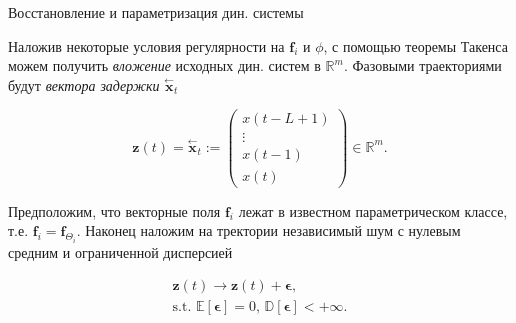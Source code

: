 \documentclass[10pt]{beamer}
\newcommand{\delayV}[1]{\overset{\leftarrow}{\textbf{x}}_{#1}}
\theoremstyle{definition}
\begin{document}
	\begin{frame}{Восстановление и параметризация дин. системы}
		
		Наложив некоторые условия регулярности на $\textbf{f}_i$ и $\phi$, с помощью теоремы Такенса можем получить \emph{вложение} исходных дин. систем в $\mathbb{R}^m$. Фазовыми траекториями будут \emph{вектора задержки} $\delayV{t}$
		
		\begin{equation*}
			\textbf{z}(t) = \delayV{t} := \begin{pmatrix}
				x(t - L + 1) \\
				\vdots \\
				x(t - 1) \\
				x(t)
			\end{pmatrix} \in \mathbb{R}^m.
		\end{equation*}
		
		Предположим, что векторные поля $\textbf{f}_i$ лежат в известном параметрическом классе, т.е. $\textbf{f}_i = \textbf{f}_{\Theta_i}$. Наконец наложим на тректории независимый шум с нулевым средним и ограниченной дисперсией
		
		\begin{gather*}
			\textbf{z}(t) \to \textbf{z}(t) + \boldsymbol{\epsilon}, \\
			\text{s.t. } \mathbb{E}[\boldsymbol{\epsilon}] = 0, \, \mathbb{D}[\boldsymbol{\epsilon}] < +\infty.
		\end{gather*}
		
	\end{frame}	
	
\end{document}
